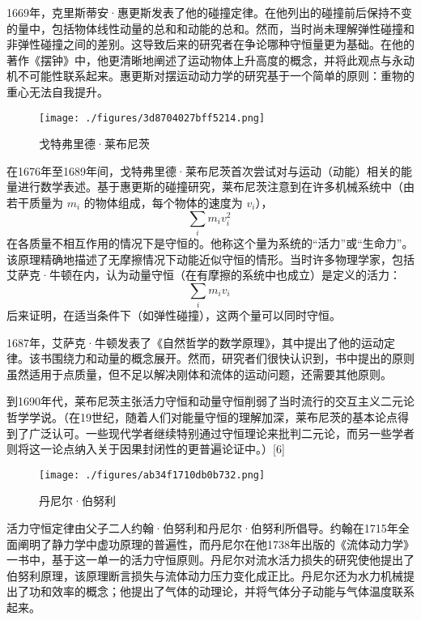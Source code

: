 1669年，克里斯蒂安·惠更斯发表了他的碰撞定律。在他列出的碰撞前后保持不变的量中，包括物体线性动量的总和和动能的总和。然而，当时尚未理解弹性碰撞和非弹性碰撞之间的差别。这导致后来的研究者在争论哪种守恒量更为基础。在他的著作《摆钟》中，他更清晰地阐述了运动物体上升高度的概念，并将此观点与永动机不可能性联系起来。惠更斯对摆运动动力学的研究基于一个简单的原则：重物的重心无法自我提升。
\begin{figure}[ht]
\centering
\texttt{[image: ./figures/3d8704027bff5214.png]}
\caption{戈特弗里德·莱布尼茨} \label{fig_NLSH_1}
\end{figure}
在1676年至1689年间，戈特弗里德·莱布尼茨首次尝试对与运动（动能）相关的能量进行数学表述。基于惠更斯的碰撞研究，莱布尼茨注意到在许多机械系统中（由若干质量为 \( m_i \) 的物体组成，每个物体的速度为 \( v_i \)），
\[
\sum _{i}m_{i}v_{i}^{2}~
\]
在各质量不相互作用的情况下是守恒的。他称这个量为系统的“活力”或“生命力”。该原理精确地描述了无摩擦情况下动能近似守恒的情形。当时许多物理学家，包括艾萨克·牛顿在内，认为动量守恒（在有摩擦的系统中也成立）是定义的活力：
\[
\sum _{i}m_{i}v_{i}~
\]
后来证明，在适当条件下（如弹性碰撞），这两个量可以同时守恒。

1687年，艾萨克·牛顿发表了《自然哲学的数学原理》，其中提出了他的运动定律。该书围绕力和动量的概念展开。然而，研究者们很快认识到，书中提出的原则虽然适用于点质量，但不足以解决刚体和流体的运动问题，还需要其他原则。

到1690年代，莱布尼茨主张活力守恒和动量守恒削弱了当时流行的交互主义二元论哲学学说。（在19世纪，随着人们对能量守恒的理解加深，莱布尼茨的基本论点得到了广泛认可。一些现代学者继续特别通过守恒理论来批判二元论，而另一些学者则将这一论点纳入关于因果封闭性的更普遍论证中。）[6]
\begin{figure}[ht]
\centering
\texttt{[image: ./figures/ab34f1710db0b732.png]}
\caption{丹尼尔·伯努利} \label{fig_NLSH_2}
\end{figure}
活力守恒定律由父子二人约翰·伯努利和丹尼尔·伯努利所倡导。约翰在1715年全面阐明了静力学中虚功原理的普遍性，而丹尼尔在他1738年出版的《流体动力学》一书中，基于这一单一的活力守恒原则。丹尼尔对流水活力损失的研究使他提出了伯努利原理，该原理断言损失与流体动力压力变化成正比。丹尼尔还为水力机械提出了功和效率的概念；他提出了气体的动理论，并将气体分子动能与气体温度联系起来。


